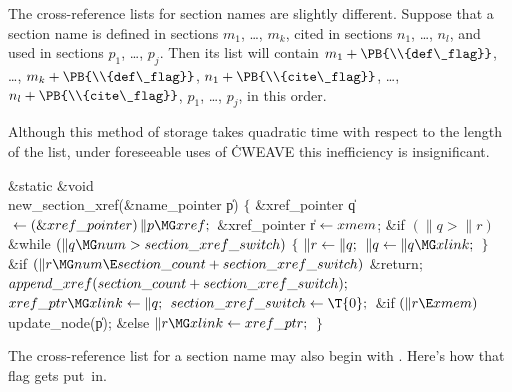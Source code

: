 The cross-reference lists for section names are slightly different.
Suppose that a section name is defined in sections $m_1$, \dots,
$m_k$, cited in sections $n_1$, \dots, $n_l$, and used in sections
$p_1$, \dots, $p_j$.  Then its list will contain $m_1+\PB{\\{def\_flag}}$,
\dots, $m_k+\PB{\\{def\_flag}}$, $n_1+\PB{\\{cite\_flag}}$, \dots,
$n_l+\PB{\\{cite\_flag}}$, $p_1$, \dots, $p_j$, in this order.

Although this method of storage takes quadratic time with respect to
the length of the list, under foreseeable uses of \.{CWEAVE} this inefficiency
is insignificant.

\Y\B\1\1\&{static} \&{void} \\{new\_section\_xref}(\&{name\_pointer} \|p)\2\2\6
${}\{{}$\1\6
\&{xref\_pointer} \|q${}\K(\&{xref\_pointer})\,\|p\MG\\{xref};{}$\6
\&{xref\_pointer} \|r${}\leftarrow\\{xmem}{}$;\7
\&{if} ${}(\|q>\|r){}$\1\6
\&{while} ${}(\|q\MG\\{num}>\\{section\_xref\_switch}){}$\5
${}\{{}$\1\6
${}\|r\leftarrow\|q;{}$\6
${}\|q\K\|q\MG\\{xlink};{}$\6
\4${}\}{}$\2\2\6
\&{if} ${}(\|r\MG\\{num}\E\\{section\_count}+\\{section\_xref\_switch}){}$\1\5
\&{return};\2\6
${}\\{append\_xref}(\\{section\_count}+\\{section\_xref\_switch});{}$\6
${}\\{xref\_ptr}\MG\\{xlink}\K\|q;{}$\6
${}\\{section\_xref\_switch}\K\T{0};{}$\6
\&{if} ${}(\|r\E\\{xmem}){}$\1\5
\\{update\_node}(\|p);\2\6
\&{else}\1\5
${}\|r\MG\\{xlink}\K\\{xref\_ptr};{}$\2\6
\4${}\}{}$\2\par
\fi

The cross-reference list for a section name may also begin with
. Here's how that flag gets put~in.

